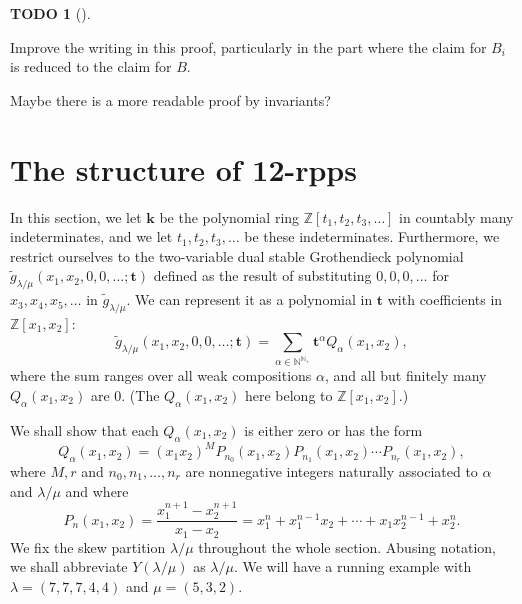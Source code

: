 \documentclass[numbers=enddot,12pt,final,onecolumn,notitlepage]{scrartcl}%
\theoremstyle{definition}
\newtheorem{quest}[theo]{TODO}
\newenvironment{todo}[1][]
{\begin{quest}[#1]\begin{leftbar}}
{\end{leftbar}\end{quest}}
\newcommand{\kk}{\mathbf{k}}
\let\sumnonlimits\sum
\renewcommand{\sum}{\sumnonlimits\limits}
\begin{document}
\begin{todo}
Improve the writing in this proof, particularly in the part where the
claim for $B_i$ is reduced to the claim for $B$.

Maybe there is a more readable proof by invariants?
\end{todo}



\section{The structure of 12-rpps}
\label{sect.structure}

\def\seplist{{\operatorname{seplist}}} %
\def\ceq{{\operatorname{ceq}}}
\def\ircont{{\operatorname{ircont}}}
\def\cont{{\operatorname{cont}}}
\def\ceqvar{{{\alpha}}} %
\def\seplistvar{{{\nu}}} %
\def\supp{{\operatorname{supp}}}
\def\NS{{\operatorname{NR}}}
\def\g{{\widetilde{g}}}
\def\t{{\mathbf{t}}}
\def\x{{\mathbf{x}}}
\def\lm{{\lambda/\mu}}
\def\lmp{{(\lambda/\mu)}}
\def\N{{\mathbb{N}}}
\def\Z{{\mathbb{Z}}}
\def\B{{\mathbf{B}}}

\def\OneTwoRPP{{\operatorname{RPP}^{12}\left(  \lambda/\mu\right)}}
\def\OneTwoRPPCutvar{{\operatorname{RPP}^{12}\left(  \lambda/\mu ;\seplistvar \right)}}
\def\flip{{\operatorname{flip}}}

In this section, 
we let $\kk$ be the polynomial ring $\Z\left[t_1, t_2, t_3, \ldots\right]$
in countably many indeterminates, and we let
$t_1, t_2, t_3, \ldots$ be these indeterminates.
Furthermore, we restrict ourselves to the
two-variable dual stable Grothendieck polynomial
$\g_\lm(x_1,x_2,0,0,\dots;\t)$ defined as the result of
substituting $0, 0, 0, \ldots$ for $x_3, x_4, x_5, \ldots$
in $\g_\lm$. We can represent it as a polynomial in
$\t$ with coefficients in $\Z[x_1,x_2]$:
$$\g_\lm(x_1,x_2,0,0,\dots;\t)=\sum_{\ceqvar\in \N^{\N_+}}\t^\ceqvar Q_\ceqvar(x_1,x_2),$$
where the sum ranges over all weak compositions $\alpha$,
and all but finitely many $Q_\ceqvar(x_1,x_2)$ are $0$.
(The $Q_\ceqvar(x_1,x_2)$ here belong to $\Z[x_1, x_2]$.)

We shall show that each $Q_\ceqvar(x_1,x_2)$ is either zero or has the form
\begin{equation}
\label{eq.Qalpha}
Q_\ceqvar(x_1,x_2)=(x_1x_2)^{M} P_{n_0}(x_1,x_2)P_{n_1}(x_1,x_2)\cdots P_{n_r}(x_1,x_2) , 
\end{equation}
where $M,r$ and $n_0,n_1,\dots,n_{r}$ are nonnegative integers naturally associated to $\ceqvar$ and $\lm$ and where
$$P_n(x_1,x_2)=\frac{x_1^{n+1}-x_2^{n+1}}{x_1-x_2}=x_1^{n}+x_1^{n-1}x_2+\cdots+x_1x_2^{n-1}+x_2^n.$$
We fix the skew partition $\lm$ throughout the whole section.
Abusing notation, we shall abbreviate $Y\left(\lm\right)$ as $\lm$.
We will have a running example with $\lambda=(7,7,7,4,4)$ and $\mu=(5,3,2)$.
\end{document}
